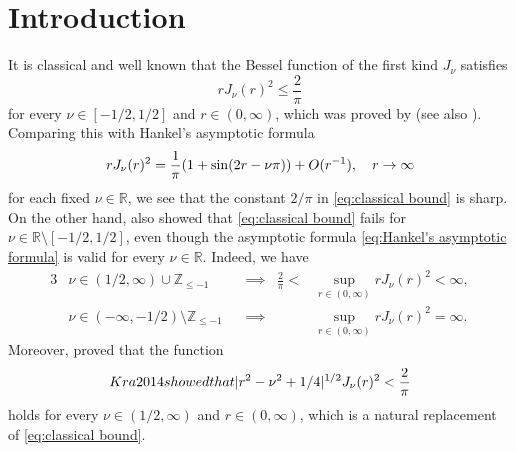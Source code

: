 \documentclass[reqno,letterpaper]{amsart}
\numberwithin{equation}{section}
\theoremstyle{plain}
\newcommand{\R}{\mathbb{R}}
\newcommand{\Z}{\mathbb{Z}}
\newcommand{\abs}[1]{\lvert#1\rvert}
\newcommand{\BesselJ}[1]{J_{#1}}
\newcommand{\intervaloo}[2]{(#1, #2)}
\newcommand{\intervalco}[2]{[#1, #2)}
\newcommand{\intervalcc}[2]{[#1, #2]}
\newcommand{\citeDLMF}[1]{\cite[\href{https://dlmf.nist.gov/#1}{#1}]{DLMF}}
\begin{document}
	\section{Introduction}
	It is classical and well known that the Bessel function of the first kind $\BesselJ{\nu}$ satisfies
	\begin{equation} \label{eq:classical bound}
		r \BesselJ{\nu}(r)^2 \leq \frac{2}{\pi}
	\end{equation}
	for every $\nu \in \intervalcc{-1/2}{1/2}$ and $r \in \intervaloo{0}{\infty}$, which was proved by \citet[Equation (18)]{Sze1933} (see also \citet[Theorem 7.31.2]{Sze1975}).
	Comparing this with Hankel's asymptotic formula \citeDLMF{10.17.3}
	\begin{equation} \label{eq:Hankel's asymptotic formula}
	r \BesselJ{\nu}(r)^2 = \frac{1}{\pi} \mleft( 1 + \sin (2r - \nu \pi) \mright) + O(r^{-1}) , \quad r \to \infty
	\end{equation}
	for each fixed $\nu \in \R$, we see that the constant $2/\pi$ in \eqref{eq:classical bound} is sharp.
	On the other hand, \citet{Sze1933} also showed that \eqref{eq:classical bound} fails for $\nu \in \R \setminus \intervalcc{-1/2}{1/2}$, even though the asymptotic formula \eqref{eq:Hankel's asymptotic formula} is valid for every $\nu \in \R$.
	Indeed, we have
	\begin{alignat}{3} 
		&\nu \in \intervaloo{1/2}{\infty} \cup \Z_{\leq -1} & &\implies& \frac{2}{\pi} < &\sup_{r \in \intervaloo{0}{\infty}} r \BesselJ{\nu}(r)^2 < \infty , 
		\label{eq:classical bound nu > 1/2} \\
		&\nu \in \intervaloo{-\infty}{-1/2} \setminus \Z_{\leq -1} & &\implies&  &\sup_{r \in \intervaloo{0}{\infty}} r \BesselJ{\nu}(r)^2 = \infty . 
		\label{eq:classical bound nu < -1/2}
	\end{alignat}
	Moreover, \citet[Section 3.2]{Lan2000} proved that the function
	\begin{equation}
		\intervalco{1/2}{\infty} \ni \nu \longmapsto \sup_{r \in \intervaloo{0}{\infty}} r \BesselJ{\nu}(r)^2
	\end{equation}
	is strictly increasing and diverges to infinity as $\nu \to \infty$.
	\citet[Theorem 3]{Kra2014} showed that
	\begin{equation} \label{eq:Kra2014 bound}
		\abs{r^2 - \nu^2 + 1/4}^{1/2} \BesselJ{\nu}(r)^2 < \frac{2}{\pi}
	\end{equation}
	holds for every $\nu \in \intervaloo{1/2}{\infty}$ and $r \in \intervaloo{0}{\infty}$, which is a natural replacement of \eqref{eq:classical bound}.
\end{document}
